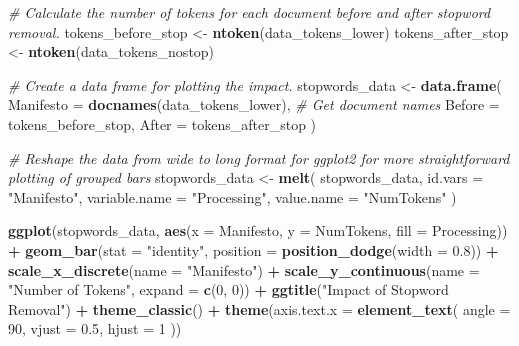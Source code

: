 \documentclass[
]{book}
\newenvironment{Shaded}{\begin{snugshade}}{\end{snugshade}}
\newcommand{\AttributeTok}[1]{\textcolor[rgb]{0.13,0.29,0.53}{#1}}
\newcommand{\CommentTok}[1]{\textcolor[rgb]{0.56,0.35,0.01}{\textit{#1}}}
\newcommand{\DecValTok}[1]{\textcolor[rgb]{0.00,0.00,0.81}{#1}}
\newcommand{\FloatTok}[1]{\textcolor[rgb]{0.00,0.00,0.81}{#1}}
\newcommand{\FunctionTok}[1]{\textcolor[rgb]{0.13,0.29,0.53}{\textbf{#1}}}
\newcommand{\NormalTok}[1]{#1}
\newcommand{\OtherTok}[1]{\textcolor[rgb]{0.56,0.35,0.01}{#1}}
\newcommand{\SpecialCharTok}[1]{\textcolor[rgb]{0.81,0.36,0.00}{\textbf{#1}}}
\newcommand{\StringTok}[1]{\textcolor[rgb]{0.31,0.60,0.02}{#1}}
\begin{document}
\begin{Shaded}
\begin{Highlighting}[]
\CommentTok{\# Calculate the number of tokens for each document before and after stopword removal.}
\NormalTok{tokens\_before\_stop }\OtherTok{\textless{}{-}} \FunctionTok{ntoken}\NormalTok{(data\_tokens\_lower)}
\NormalTok{tokens\_after\_stop }\OtherTok{\textless{}{-}} \FunctionTok{ntoken}\NormalTok{(data\_tokens\_nostop)}

\CommentTok{\# Create a data frame for plotting the impact.}
\NormalTok{stopwords\_data }\OtherTok{\textless{}{-}} \FunctionTok{data.frame}\NormalTok{(}
  \AttributeTok{Manifesto =} \FunctionTok{docnames}\NormalTok{(data\_tokens\_lower),}
  \CommentTok{\# Get document names}
  \AttributeTok{Before =}\NormalTok{ tokens\_before\_stop,}
  \AttributeTok{After =}\NormalTok{ tokens\_after\_stop}
\NormalTok{)}

\CommentTok{\# Reshape the data from wide to long format for ggplot2 for more straightforward plotting of grouped bars}
\NormalTok{stopwords\_data }\OtherTok{\textless{}{-}} \FunctionTok{melt}\NormalTok{(}
\NormalTok{  stopwords\_data,}
  \AttributeTok{id.vars =} \StringTok{"Manifesto"}\NormalTok{,}
  \AttributeTok{variable.name =} \StringTok{"Processing"}\NormalTok{,}
  \AttributeTok{value.name =} \StringTok{"NumTokens"}
\NormalTok{)}

\FunctionTok{ggplot}\NormalTok{(stopwords\_data,}
       \FunctionTok{aes}\NormalTok{(}\AttributeTok{x =}\NormalTok{ Manifesto, }\AttributeTok{y =}\NormalTok{ NumTokens, }\AttributeTok{fill =}\NormalTok{ Processing)) }\SpecialCharTok{+}
  \FunctionTok{geom\_bar}\NormalTok{(}\AttributeTok{stat =} \StringTok{"identity"}\NormalTok{, }\AttributeTok{position =} \FunctionTok{position\_dodge}\NormalTok{(}\AttributeTok{width =} \FloatTok{0.8}\NormalTok{)) }\SpecialCharTok{+}
  \FunctionTok{scale\_x\_discrete}\NormalTok{(}\AttributeTok{name =} \StringTok{"Manifesto"}\NormalTok{) }\SpecialCharTok{+}
  \FunctionTok{scale\_y\_continuous}\NormalTok{(}\AttributeTok{name =} \StringTok{"Number of Tokens"}\NormalTok{, }\AttributeTok{expand =} \FunctionTok{c}\NormalTok{(}\DecValTok{0}\NormalTok{, }\DecValTok{0}\NormalTok{)) }\SpecialCharTok{+}
  \FunctionTok{ggtitle}\NormalTok{(}\StringTok{"Impact of Stopword Removal"}\NormalTok{) }\SpecialCharTok{+}
  \FunctionTok{theme\_classic}\NormalTok{() }\SpecialCharTok{+}
  \FunctionTok{theme}\NormalTok{(}\AttributeTok{axis.text.x =} \FunctionTok{element\_text}\NormalTok{(}
    \AttributeTok{angle =} \DecValTok{90}\NormalTok{,}
    \AttributeTok{vjust =} \FloatTok{0.5}\NormalTok{,}
    \AttributeTok{hjust =} \DecValTok{1}
\NormalTok{  ))}
\end{Highlighting}
\end{Shaded}
\end{document}
